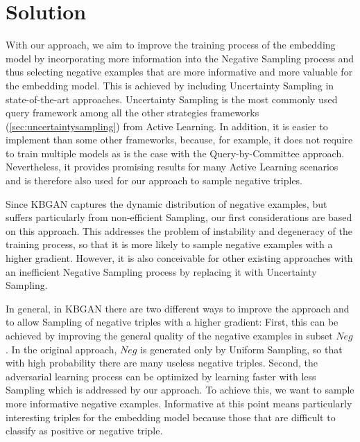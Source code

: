 \chapter{Solution}
\label{ch:solution}

With our approach, we aim to improve the training process of the embedding model by incorporating more information into the Negative Sampling process and thus selecting negative examples that are more informative and more valuable for the embedding model.
This is achieved by including Uncertainty Sampling in state-of-the-art approaches.
Uncertainty Sampling is the most commonly used query framework among all the other strategies frameworks (\autoref{sec:uncertaintysampling}) from Active Learning.
In addition, it is easier to implement than some other frameworks, because, for example, it does not require to train multiple models as is the case with the Query-by-Committee approach.
Nevertheless, it provides promising results for many Active Learning scenarios and is therefore also used for our approach to sample negative triples.

Since \ac{KBGAN} captures the dynamic distribution of negative examples, but suffers particularly from non-efficient Sampling, our first considerations are based on this approach.
This addresses the problem of instability and degeneracy of the training process, so that it is more likely to sample negative examples with a higher gradient.
However, it is also conceivable for other existing approaches with an inefficient Negative Sampling process by replacing it with Uncertainty Sampling.

In general, in \ac{KBGAN} there are two different ways to improve the approach and to allow Sampling of negative triples with a higher gradient:
First, this can be achieved by improving the general quality of the negative examples in subset $Neg$.
In the original approach, $Neg$ is generated only by Uniform Sampling, so that with high probability there are many useless negative triples.
Second, the adversarial learning process can be optimized by learning faster with less Sampling which is addressed by our approach.
To achieve this, we want to sample more informative negative examples.
Informative at this point means particularly interesting triples for the embedding model because those that are difficult to classify as positive or negative triple.


